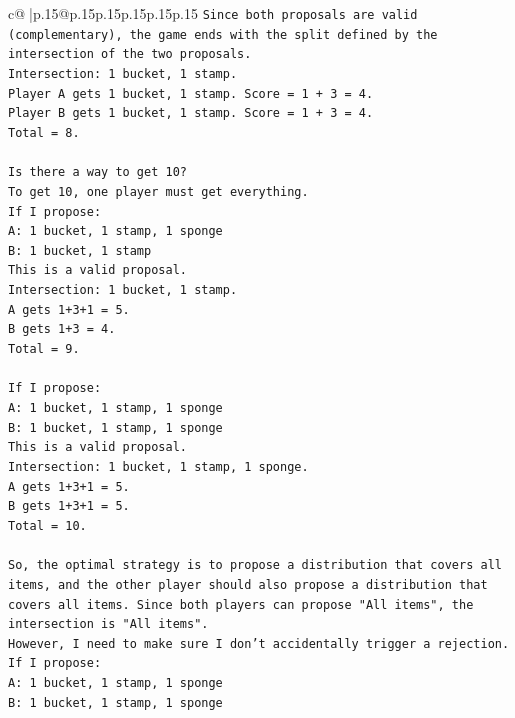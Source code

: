 \documentclass{article}
\begin{document}
{\begin{supertabular}{c@{$\;$}|p{.15\linewidth}@{}p{.15\linewidth}p{.15\linewidth}p{.15\linewidth}p{.15\linewidth}p{.15\linewidth}}
{{{\texttt{Since both proposals are valid (complementary), the game ends with the split defined by the intersection of the two proposals.} \\
\texttt{Intersection: 1 bucket, 1 stamp.} \\
\texttt{Player A gets 1 bucket, 1 stamp. Score = 1 + 3 = 4.} \\
\texttt{Player B gets 1 bucket, 1 stamp. Score = 1 + 3 = 4.} \\
\texttt{Total = 8.} \\
\\ 
\texttt{Is there a way to get 10?} \\
\texttt{To get 10, one player must get everything.} \\
\texttt{If I propose:} \\
\texttt{A: 1 bucket, 1 stamp, 1 sponge} \\
\texttt{B: 1 bucket, 1 stamp} \\
\texttt{This is a valid proposal.} \\
\texttt{Intersection: 1 bucket, 1 stamp.} \\
\texttt{A gets 1+3+1 = 5.} \\
\texttt{B gets 1+3 = 4.} \\
\texttt{Total = 9.} \\
\\ 
\texttt{If I propose:} \\
\texttt{A: 1 bucket, 1 stamp, 1 sponge} \\
\texttt{B: 1 bucket, 1 stamp, 1 sponge} \\
\texttt{This is a valid proposal.} \\
\texttt{Intersection: 1 bucket, 1 stamp, 1 sponge.} \\
\texttt{A gets 1+3+1 = 5.} \\
\texttt{B gets 1+3+1 = 5.} \\
\texttt{Total = 10.} \\
\\ 
\texttt{So, the optimal strategy is to propose a distribution that covers all items, and the other player should also propose a distribution that covers all items. Since both players can propose "All items", the intersection is "All items".} \\
\texttt{However, I need to make sure I don't accidentally trigger a rejection.} \\
\texttt{If I propose:} \\
\texttt{A: 1 bucket, 1 stamp, 1 sponge} \\
\texttt{B: 1 bucket, 1 stamp, 1 sponge} \\
}}}
\end{supertabular}}
\end{document}
